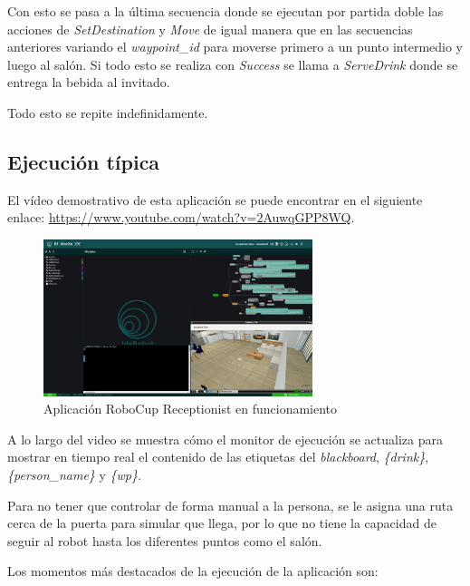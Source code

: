 Con esto se pasa a la última secuencia donde se ejecutan por partida doble las acciones de \textit{SetDestination} y \textit{Move} de igual manera que en las secuencias anteriores variando el \textit{waypoint\_id} para moverse primero a un punto intermedio y luego al salón. Si todo esto se realiza con \textit{Success} se llama a \textit{ServeDrink} donde se entrega la bebida al invitado.

Todo esto se repite indefinidamente.

\subsection{Ejecución típica}

El vídeo demostrativo de esta aplicación se puede encontrar en el siguiente enlace: \url{https://www.youtube.com/watch?v=2AuwqGPP8WQ}. 

\begin{figure}[H]
    \centering
    \includegraphics[width=0.7\textwidth]{figures/validation/receptionist-teaser.jpg}
    \caption{Aplicación RoboCup Receptionist en funcionamiento}
    \label{fig:ejemplo}
\end{figure}

\noindent A lo largo del video se muestra cómo el monitor de ejecución se actualiza para mostrar en tiempo real el contenido de las etiquetas del \textit{blackboard}, \textit{\{drink\}}, \textit{\{person\_name\}} y \textit{\{wp\}}.

\noindent Para no tener que controlar de forma manual a la persona, se le asigna una ruta cerca de la puerta para simular que llega, por lo que no tiene la capacidad de seguir al robot hasta los diferentes puntos como el salón.

\noindent Los momentos más destacados de la ejecución de la aplicación son:

